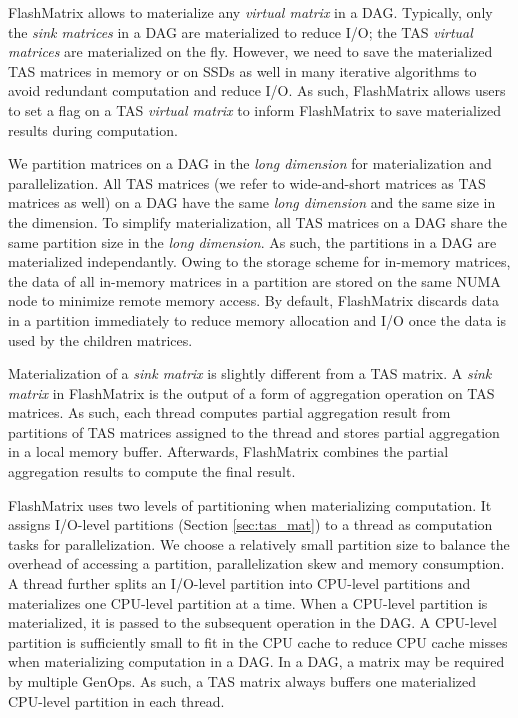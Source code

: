FlashMatrix allows to materialize any \textit{virtual matrix} in a DAG.
Typically, only the \textit{sink matrices} in a DAG are materialized to reduce
I/O; the TAS \textit{virtual matrices} are materialized on the fly. However,
we need to save the materialized TAS matrices in memory or on SSDs as well in
many iterative algorithms to avoid redundant computation and reduce I/O. As such,
FlashMatrix allows users to set a flag on a TAS \textit{virtual matrix} to
inform FlashMatrix to save materialized results during computation.

We partition matrices on a DAG in the \textit{long dimension} for materialization
and parallelization. All TAS matrices (we refer to wide-and-short matrices as TAS
matrices as well) on a DAG have the same \textit{long dimension} and the same size
in the dimension. To simplify materialization, all TAS matrices on a DAG share
the same partition size in the \textit{long dimension}. As such, the partitions
in a DAG are materialized independantly. Owing to the storage scheme for
in-memory matrices, the data of all in-memory matrices in a partition are stored
on the same NUMA node to minimize remote memory access. By default, FlashMatrix
discards data in a partition immediately to reduce memory allocation and I/O
once the data is used by the children matrices.

Materialization of a \textit{sink matrix} is slightly different from a TAS matrix.
A \textit{sink matrix} in FlashMatrix is the output of a form of aggregation
operation on TAS matrices. As such, each thread computes partial aggregation
result from partitions of TAS matrices assigned to the thread and stores partial
aggregation in a local memory buffer. Afterwards, FlashMatrix combines
the partial aggregation results to compute the final result.


FlashMatrix uses two levels of partitioning when materializing computation.
It assigns I/O-level partitions (Section \ref{sec:tas_mat}) to a thread as
computation tasks for parallelization. We choose a relatively small partition
size to balance the overhead of accessing a partition, parallelization skew
and memory consumption. A thread further splits an I/O-level partition into
CPU-level partitions and materializes one CPU-level partition at a time.
When a CPU-level partition is materialized, it is passed to the subsequent
operation in the DAG. A CPU-level partition is sufficiently small to fit in
the CPU cache to reduce CPU cache misses when materializing computation in
a DAG. In a DAG, a matrix may be required by multiple GenOps. As such,
a TAS matrix always buffers one materialized CPU-level partition in each
thread. 


